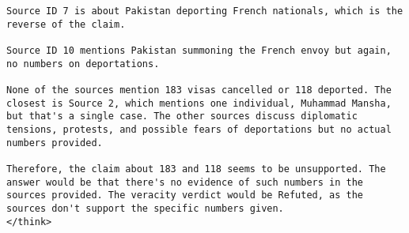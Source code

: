 \begin{figure*}
\begin{lstlisting}[breaklines=true, language={}, frame=single, caption={Qwen3 thinking tokens example.}, label={lst:think}]
Source ID 7 is about Pakistan deporting French nationals, which is the reverse of the claim. 

Source ID 10 mentions Pakistan summoning the French envoy but again, no numbers on deportations.

None of the sources mention 183 visas cancelled or 118 deported. The closest is Source 2, which mentions one individual, Muhammad Mansha, but that's a single case. The other sources discuss diplomatic tensions, protests, and possible fears of deportations but no actual numbers provided. 

Therefore, the claim about 183 and 118 seems to be unsupported. The answer would be that there's no evidence of such numbers in the sources provided. The veracity verdict would be Refuted, as the sources don't support the specific numbers given.
</think>
    \end{lstlisting}
\end{figure*}